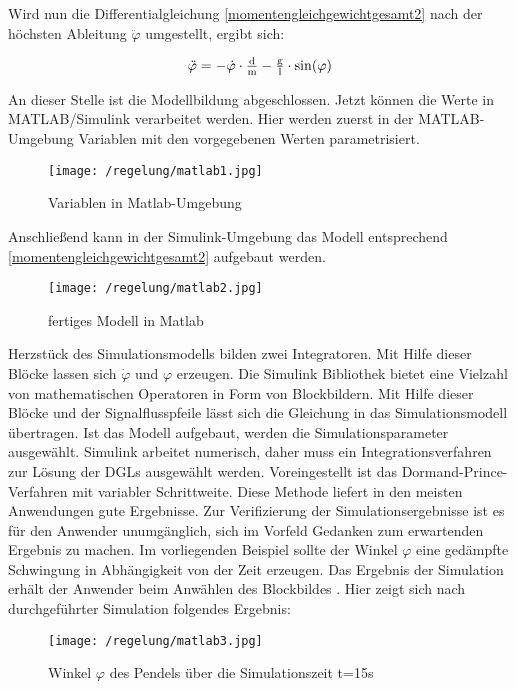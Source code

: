 Wird nun die Differentialgleichung \ref{momentengleichgewichtgesamt2} nach der höchsten Ableitung $\ddot\varphi$ umgestellt, ergibt sich:

\begin{align}
	\ddot\varphi = -\dot\varphi \cdot \tfrac{\i{d}}{\i{m}} - \tfrac{\i{g}}{\i{l}} \cdot \si{sin}(\varphi)
	\label{diffgleichung} 
\end{align}

An dieser Stelle ist die Modellbildung abgeschlossen. Jetzt können die Werte in MATLAB/Simulink  verarbeitet werden.
Hier werden zuerst in der MATLAB-Umgebung Variablen mit den vorgegebenen Werten parametrisiert.

\begin{figure}[h]
	\centering
	\texttt{[image: /regelung/matlab1.jpg]}
	\label{fig:matlab1}
	\caption{Variablen in Matlab-Umgebung}
\end{figure}

Anschließend kann in der Simulink-Umgebung das Modell entsprechend \ref{momentengleichgewichtgesamt2} aufgebaut werden.

\begin{figure}[h]
	\centering
	\texttt{[image: /regelung/matlab2.jpg]}
	\label{fig:matlab2}
	\caption{fertiges Modell in Matlab}
\end{figure}

Herzstück des Simulationsmodells bilden zwei Integratoren.
Mit Hilfe dieser Blöcke lassen sich  $\dot{\varphi}$ und $\varphi$ erzeugen.
Die Simulink Bibliothek bietet eine Vielzahl von mathematischen Operatoren in Form von Blockbildern.
Mit Hilfe dieser Blöcke und der Signalflusspfeile lässt sich die Gleichung in das Simulationsmodell übertragen.
Ist das Modell aufgebaut, werden die Simulationsparameter ausgewählt. 
Simulink arbeitet numerisch, daher muss ein Integrationsverfahren zur Lösung der DGLs ausgewählt werden. Voreingestellt ist das Dormand-Prince-Verfahren mit variabler Schrittweite.
Diese Methode liefert in den meisten Anwendungen gute Ergebnisse. \autocite[S.~6]{scherf2010}
Zur Verifizierung der Simulationsergebnisse ist es für den Anwender unumgänglich, sich im Vorfeld Gedanken zum erwartenden Ergebnis zu machen.
Im vorliegenden Beispiel sollte der Winkel $\varphi$ eine gedämpfte Schwingung in Abhängigkeit von der Zeit erzeugen.
Das Ergebnis der Simulation erhält der Anwender beim Anwählen des Blockbildes \grqq.
Hier zeigt sich nach durchgeführter Simulation folgendes Ergebnis:

\begin{figure}[h]
	\centering
	\texttt{[image: /regelung/matlab3.jpg]}
	\label{fig:matlab3}
	\caption{ Winkel $\varphi$ des Pendels über die Simulationszeit t=15s}
\end{figure}

